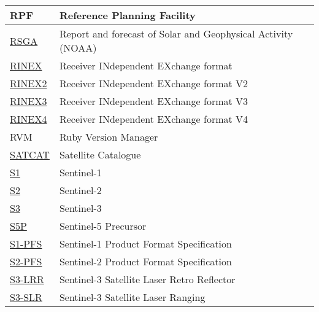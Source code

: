 \documentclass[dec_sum_main.tex]{subfiles}
\begin{document}
\begin{longtable}{|m{2.8cm}|m{10cm}|}
    RPF & Reference Planning Facility \\ \hline
	\href{https://www.swpc.noaa.gov/products/solar-and-geophysical-activity-summary}{RSGA} & Report and forecast of Solar and Geophysical Activity  (NOAA)\\ \hline
	\href{https://www.igs.org/wg/rinex/#documents-formats}{RINEX} & Receiver INdependent EXchange format \\ \hline
	\href{https://files.igs.org/pub/data/format/rinex211.txt}{RINEX2} & Receiver INdependent EXchange format V2 \\ \hline
	\href{https://files.igs.org/pub/data/format/rinex305.pdf}{RINEX3} & Receiver INdependent EXchange format V3 \\ \hline
	\href{https://files.igs.org/pub/data/format/rinex_4.00.pdf}{RINEX4} & Receiver INdependent EXchange format V4 \\ \hline	
	RVM & Ruby Version Manager \\ \hline
    \href{https://celestrak.com/satcat/search.php}{SATCAT} & Satellite Catalogue \\ \hline
	\href{https://sentinels.copernicus.eu/web/sentinel/missions/sentinel-1}{S1} & Sentinel-1 \\ \hline
	\href{https://sentinels.copernicus.eu/web/sentinel/missions/sentinel-2}{S2} & Sentinel-2 \\ \hline
	\href{https://sentinels.copernicus.eu/web/sentinel/missions/sentinel-3}{S3} & Sentinel-3 \\ \hline
    \href{https://sentinels.copernicus.eu/web/sentinel/missions/sentinel-5p}{S5P} & Sentinel-5 Precursor \\ \hline
	\href{https://sentinels.copernicus.eu/documents/247904/1877131/S1-RS-MDA-52-7441-3-9-2_Sentinel-1ProductSpecification.pdf/4f4488ef-60ad-52cb-160c-71ebdf6ca820?t=1641274625444}{S1-PFS} & Sentinel-1 Product Format Specification\\ \hline
	\href{https://sentinels.copernicus.eu/documents/247904/685211/S2-PDGS-TAS-DI-PSD-V14.9.pdf/3d3b6c9c-4334-dcc4-3aa7-f7c0deffbaf7?t=1643013091529}{S2-PFS} & Sentinel-2 Product Format Specification\\ \hline
	\href{https://sentinels.copernicus.eu/web/sentinel/technical-guides/sentinel-3-altimetry/instrument/lrr}{S3-LRR} & Sentinel-3 Satellite Laser Retro Reflector\\ \hline	
	\href{https://sentinels.copernicus.eu/web/sentinel/technical-guides/sentinel-3-altimetry/pod/slr-tracking}{S3-SLR} & Sentinel-3 Satellite Laser Ranging\\ \hline

\end{longtable}
\end{document}
